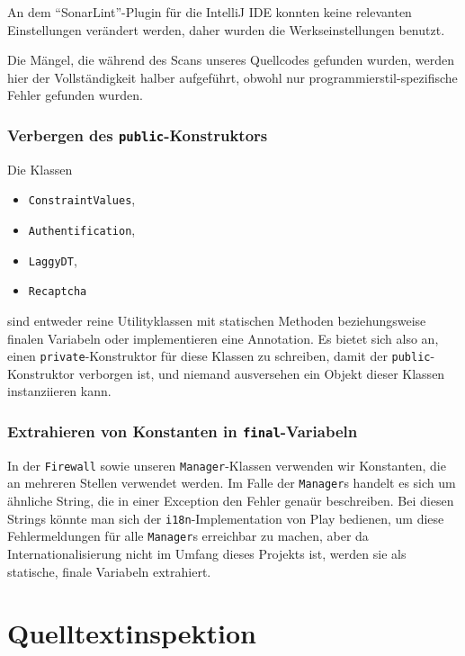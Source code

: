\documentclass[12pt,DIV14,BCOR10mm,a4paper,twoside,parskip=half-,headsepline,headinclude,english,ngerman,bibliography=totocnumbered]{scrreprt}
\begin{document}
An dem \enquote{SonarLint}-Plugin für die IntelliJ IDE konnten keine relevanten Einstellungen verändert werden, daher wurden die Werkseinstellungen benutzt.

Die Mängel, die während des Scans unseres Quellcodes gefunden wurden, werden hier der Vollständigkeit halber aufgeführt, obwohl nur programmierstil-spezifische Fehler gefunden wurden.

\subsubsection{Verbergen des \texttt{public}-Konstruktors}

Die Klassen

\begin{itemize}
  \item \texttt{ConstraintValues},
  \item \texttt{Authentification},
  \item \texttt{LaggyDT},
  \item \texttt{Recaptcha}
\end{itemize}

sind entweder reine Utilityklassen mit statischen Methoden beziehungsweise finalen Variabeln oder implementieren eine Annotation.
Es bietet sich also an, einen \texttt{private}-Konstruktor für diese Klassen zu schreiben, damit der \texttt{public}-Konstruktor verborgen ist, und niemand ausversehen ein Objekt dieser Klassen instanziieren kann.

\subsubsection{Extrahieren von Konstanten in \texttt{final}-Variabeln}

In der \texttt{Firewall} sowie unseren \texttt{Manager}-Klassen verwenden wir Konstanten, die an mehreren Stellen verwendet werden.
Im Falle der \texttt{Manager}s handelt es sich um ähnliche String, die in einer Exception den Fehler genaür beschreiben.
Bei diesen Strings könnte man sich der \texttt{i18n}-Implementation von Play bedienen, um diese Fehlermeldungen für alle \texttt{Manager}s erreichbar zu machen, aber da Internationalisierung nicht im Umfang dieses Projekts ist, werden sie als statische, finale Variabeln extrahiert.

\section{Quelltextinspektion}
\end{document}
